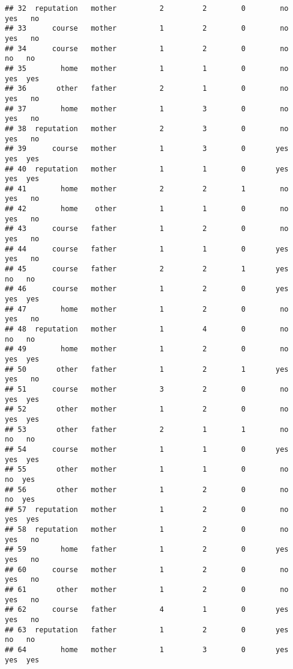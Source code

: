 \documentclass[
]{article}
\begin{document}
\begin{verbatim}
## 32  reputation   mother          2         2        0        no    yes   no
## 33      course   mother          1         2        0        no    yes   no
## 34      course   mother          1         2        0        no     no   no
## 35        home   mother          1         1        0        no    yes  yes
## 36       other   father          2         1        0        no    yes   no
## 37        home   mother          1         3        0        no    yes   no
## 38  reputation   mother          2         3        0        no    yes   no
## 39      course   mother          1         3        0       yes    yes  yes
## 40  reputation   mother          1         1        0       yes    yes  yes
## 41        home   mother          2         2        1        no    yes   no
## 42        home    other          1         1        0        no    yes   no
## 43      course   father          1         2        0        no    yes   no
## 44      course   father          1         1        0       yes    yes   no
## 45      course   father          2         2        1       yes     no   no
## 46      course   mother          1         2        0       yes    yes  yes
## 47        home   mother          1         2        0        no    yes   no
## 48  reputation   mother          1         4        0        no     no   no
## 49        home   mother          1         2        0        no    yes  yes
## 50       other   father          1         2        1       yes    yes   no
## 51      course   mother          3         2        0        no    yes  yes
## 52       other   mother          1         2        0        no    yes  yes
## 53       other   father          2         1        1        no     no   no
## 54      course   mother          1         1        0       yes    yes  yes
## 55       other   mother          1         1        0        no     no  yes
## 56       other   mother          1         2        0        no     no  yes
## 57  reputation   mother          1         2        0        no    yes  yes
## 58  reputation   mother          1         2        0        no    yes   no
## 59        home   father          1         2        0       yes    yes   no
## 60      course   mother          1         2        0        no    yes   no
## 61       other   mother          1         2        0        no    yes   no
## 62      course   father          4         1        0       yes    yes   no
## 63  reputation   father          1         2        0       yes     no   no
## 64        home   mother          1         3        0       yes    yes  yes

\end{verbatim}
\end{document}
